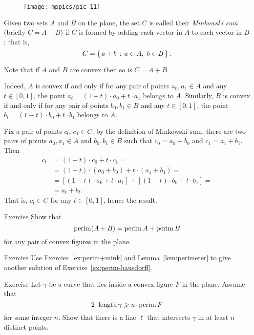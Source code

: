 \begin{wrapfigure}{r}{33 mm}
\vskip-0mm
\centering
\texttt{[image: mppics/pic-11]}
\vskip0mm
\end{wrapfigure}

Given two sets $A$ and $B$ on the plane, the set $C$ is called their \emph{Minkowski sum}  (briefly $C=A+B$) if $C$ is formed by adding each vector in $A$ to each vector in $B$;
that is, 
\[C = \left\{\,{a+b}\,:\,{a\in A,\ b\in B}\,\right\}.\]

Note that if $A$ and $B$ are convex then so is $C=A+B$. %

Indeed, $A$ is convex if and only if for any pair of points $a_0,a_1\in A$ and any $t\in[0,1]$,
the point $a_t=(1-t)\cdot a_0+t\cdot a_1$ belongs to $A$.
Similarly, $B$ is convex if and only if for any pair of points $b_0,b_1\in B$ and any $t\in[0,1]$,
the point $b_t=(1-t)\cdot b_0+t\cdot b_1$ belongs to $A$.

Fix a pair of points $c_0,c_1\in C$;
by the definition of Minkowski sum, there are two pairs of points $a_0,a_1\in A$ and $b_0,b_1\in B$ such that $c_0=a_0+b_0$ and $c_1=a_1+b_1$.
Then 
\begin{align*}
c_t&=(1-t)\cdot c_0+t\cdot c_1=
\\
&=(1-t)\cdot (a_0+b_0)+t\cdot(a_1+b_1)=
\\
&=[(1-t)\cdot a_0+t\cdot a_1]+[(1-t)\cdot b_0+t\cdot b_1]=
\\
&=a_t+b_t.
\end{align*}
That is, $c_t\in C$ for any $t\in [0,1]$, hence the result.


\begin{thm}{Exercise}\label{ex:perim+mink}
Show that 
\[\mathop{\rm perim}\nolimits(A+B)=\mathop{\rm perim}\nolimits A+\mathop{\rm perim}\nolimits B\]
for any pair of convex figures in the plane.
\end{thm}

\begin{thm}{Exercise}
Use Exercise~\ref{ex:perim+mink} and Lemma~\ref{lem:perimeter} to give another solution of Exercise~\ref{ex:perim-hausdorff}.
\end{thm}

\begin{thm}{Exercise}
Let $\gamma$ be a curve that lies inside a convex figure $F$ in the plane.
Assume that
\[2\cdot \length \gamma\ge n\cdot \perim F\]
for some integer $n$.
Show that there is a line $\ell$ that intersects $\gamma$ in at least $n$ distinct points.
\end{thm}

